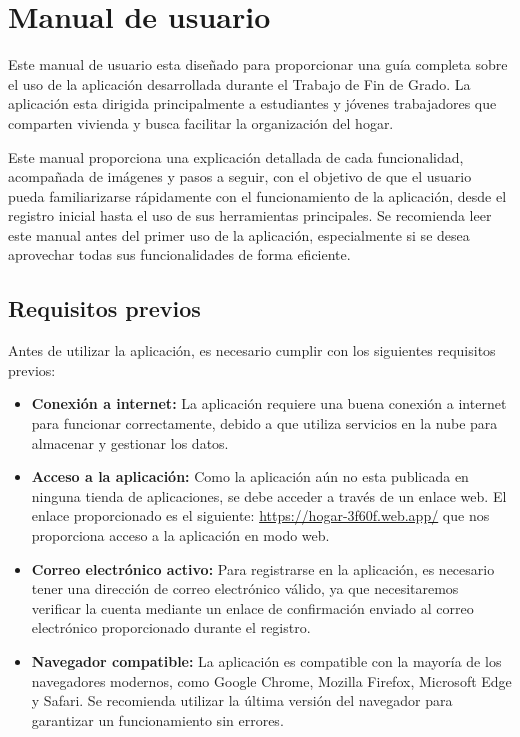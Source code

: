 \chapter{Manual de usuario}
\label{cap:manual_usuario}

Este manual de usuario esta diseñado para proporcionar una guía completa sobre el uso de la aplicación desarrollada durante el Trabajo de Fin de Grado.
La aplicación esta dirigida principalmente a estudiantes y jóvenes trabajadores que comparten vivienda y busca facilitar la organización del hogar.


Este manual proporciona una explicación detallada de cada funcionalidad, acompañada de imágenes y pasos a seguir, con el objetivo de que el usuario pueda familiarizarse rápidamente con el funcionamiento de la aplicación, desde el registro inicial hasta el uso de sus herramientas principales.
Se recomienda leer este manual antes del primer uso de la aplicación, especialmente si se desea aprovechar todas sus funcionalidades de forma eficiente.

\section{Requisitos previos}
Antes de utilizar la aplicación, es necesario cumplir con los siguientes requisitos previos:

\begin{itemize}
    \item \textbf{Conexión a internet:} La aplicación requiere una buena conexión a internet para funcionar correctamente, debido a que utiliza servicios en la nube para almacenar y gestionar los datos.
    \item \textbf{Acceso a la aplicación:} Como la aplicación aún no esta publicada en ninguna tienda de aplicaciones, se debe acceder a través de un enlace web. El enlace proporcionado es el siguiente: \url{https://hogar-3f60f.web.app/} que nos proporciona acceso a la aplicación en modo web.
    \item \textbf{Correo electrónico activo:} Para registrarse en la aplicación, es necesario tener una dirección de correo electrónico válido, ya que necesitaremos verificar la cuenta mediante un enlace de confirmación enviado al correo electrónico proporcionado durante el registro.
    \item \textbf{Navegador compatible:} La aplicación es compatible con la mayoría de los navegadores modernos, como Google Chrome, Mozilla Firefox, Microsoft Edge y Safari. Se recomienda utilizar la última versión del navegador para garantizar un funcionamiento sin errores. 
\end{itemize}


